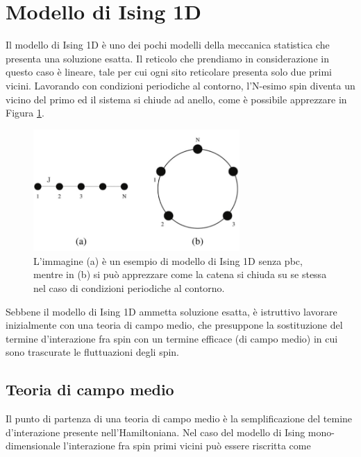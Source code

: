 \section{Modello di Ising 1D}

Il modello di Ising 1D è uno dei pochi modelli della meccanica statistica che presenta una soluzione esatta.
Il reticolo che prendiamo in considerazione in questo caso è lineare, tale per cui ogni sito reticolare presenta 
solo due primi vicini. Lavorando con condizioni periodiche al contorno, l'N-esimo spin diventa un vicino del 
primo ed il sistema si chiude ad anello, come è possibile apprezzare in Figura \ref{fig: Ising1D_pbc}.

\begin{figure}[h!]
    \centering
    \includegraphics[width=0.7\textwidth]{Immagini/Ising1D_pbc.png}
    \caption{L'immagine (a) è un esempio di modello di Ising 1D senza pbc, mentre in (b) si può apprezzare 
    come la catena si chiuda su se stessa nel caso di condizioni periodiche al contorno. }
    \label{fig: Ising1D_pbc}
\end{figure}

Sebbene il modello di Ising 1D ammetta soluzione esatta, è istruttivo lavorare inizialmente con una teoria di campo 
medio, che presuppone la sostituzione del termine d'interazione fra spin con un termine efficace (di campo medio) in cui 
sono trascurate le fluttuazioni degli spin.



\subsection{Teoria di campo medio}

Il punto di partenza di una teoria di campo medio è la semplificazione del temine d'interazione presente nell'Hamiltoniana. Nel  
caso del modello di Ising mono-dimensionale l'interazione fra spin primi vicini può essere riscritta come

